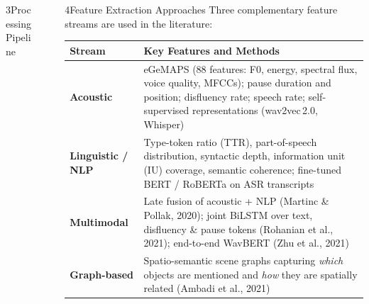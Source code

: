 \documentclass[final]{beamer}
\newlength{\colsep}
\newlength{\leftcol}
\newlength{\rightcol}
\begin{document}
\begin{frame}[t]
\begin{columns}[T, totalwidth=\linewidth]
\begin{column}{\leftcol}
\begin{block}{3\enspace Processing Pipeline}
\begin{center}
\begin{tikzpicture}
\end{tikzpicture}
\end{center}
\vspace{0.3em}
\end{block}

\end{column}

\begin{column}{\colsep}\end{column}

\begin{column}{\rightcol}

\begin{block}{4\enspace Feature Extraction Approaches}
\justifying
Three complementary feature streams are used in the literature:

\vspace{0.5em}
\renewcommand{\arraystretch}{1.4}
\begin{tabular}{@{}>{\bfseries}p{} p{}@{}}
  \toprule
  \rowcolor{Cprimary!12}
  Stream & Key Features and Methods \\
  \midrule
  Acoustic
    & eGeMAPS (88 features: F0, energy, spectral flux, voice quality,
      MFCCs); pause duration and position; disfluency rate;
      speech rate; self-supervised representations
      (wav2vec\,2.0, Whisper) \\
  Linguistic / NLP
    & Type-token ratio (TTR), part-of-speech distribution,
      syntactic depth, information unit (IU) coverage,
      semantic coherence; fine-tuned BERT / RoBERTa
      on ASR transcripts \\
  Multimodal
    & Late fusion of acoustic + NLP (Martinc \& Pollak, 2020);
      joint BiLSTM over text, disfluency \& pause tokens
      (Rohanian et al., 2021); end-to-end WavBERT
      (Zhu et al., 2021) \\
  Graph-based
    & Spatio-semantic scene graphs capturing \emph{which} objects
      are mentioned and \emph{how} they are spatially related
      (Ambadi et al., 2021) \\
  \bottomrule
\end{tabular}
\end{block}


\end{column}
\end{columns}
\end{frame}
\end{document}
